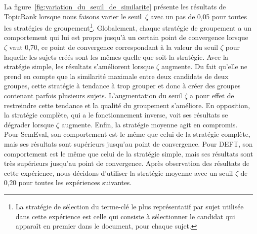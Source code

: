     La figure~\ref{fig:variation_du_seuil_de_similarite} présente les résultats
    de TopicRank lorsque nous faisons varier le seuil~$\zeta$ avec un pas de
    0,05 pour toutes les stratégies de groupement\footnote{La stratégie de
    sélection du terme-clé le plus représentatif par sujet utilisée dans cette
    expérience est celle qui consiste à sélectionner le candidat qui apparaît en
    premier dans le document, pour chaque sujet.}.
    Globalement, chaque stratégie de groupement a un comportement qui lui est
    propre jusqu'à un certain point de convergence lorsque $\zeta$ vaut 0,70, ce
    point de convergence correspondant à la valeur du seuil $\zeta$ pour
    laquelle les sujets créés sont les mêmes quelle que soit la stratégie. Avec
    la stratégie simple, les résultats s'améliorent lorsque $\zeta$
    augmente. Du fait qu'elle ne prend en compte que la similarité maximale
    entre deux candidats de deux groupes, cette stratégie à tendance à trop
    grouper et donc à créer des groupes contenant parfois plusieurs sujets.
    L'augmentation du seuil $\zeta$ a pour effet de restreindre cette tendance
    et la qualité du groupement s'améliore. En opposition, la stratégie
    complète, qui a le fonctionnement inverse, voit ses résultats se dégrader
    lorsque $\zeta$ augmente. Enfin, la stratégie moyenne agit en compromis.
    Pour SemEval, son comportement est le même que celui de la stratégie
    complète, mais ses résultats sont supérieurs jusqu'au point de convergence.
    Pour DEFT, son comportement est le même que celui de la stratégie simple,
    mais ses résultats sont très supérieurs jusqu'au point de convergence.
    Après observation des résultats de cette expérience, nous décidons
    d'utiliser la stratégie moyenne avec un seuil $\zeta$ de 0,20 pour toutes
    les expériences suivantes.

